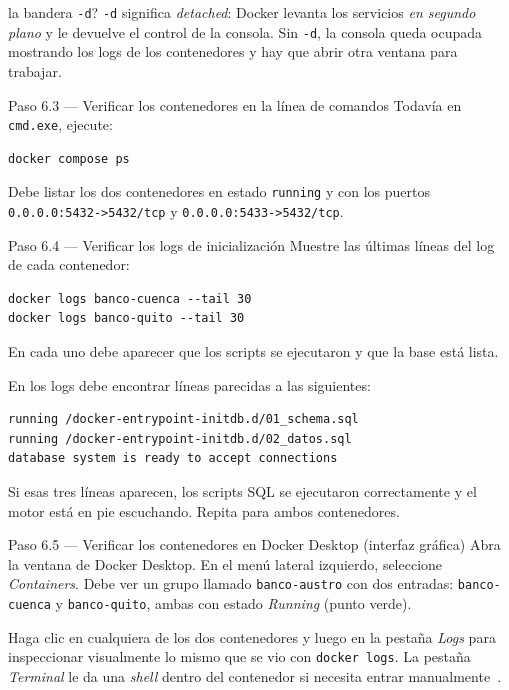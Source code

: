\documentclass[11pt,a4paper]{article}
\begin{document}
\begin{conceptobox}{la bandera \texttt{-d}?}
\texttt{-d} significa \emph{detached}: Docker levanta los servicios \emph{en segundo plano} y le devuelve el control de la consola. Sin \texttt{-d}, la consola queda ocupada mostrando los logs de los contenedores y hay que abrir otra ventana para trabajar.
\end{conceptobox}

\begin{pasobox}{Paso 6.3 --- Verificar los contenedores en la l\'inea de comandos}
Todav\'ia en \texttt{cmd.exe}, ejecute:

\begin{lstlisting}[style=bashstyle]
docker compose ps
\end{lstlisting}

Debe listar los dos contenedores en estado \texttt{running} y con los puertos \texttt{0.0.0.0:5432->5432/tcp} y \texttt{0.0.0.0:5433->5432/tcp}.
\end{pasobox}

\begin{pasobox}{Paso 6.4 --- Verificar los logs de inicializaci\'on}
Muestre las \'ultimas l\'ineas del log de cada contenedor:

\begin{lstlisting}[style=bashstyle]
docker logs banco-cuenca --tail 30
docker logs banco-quito --tail 30
\end{lstlisting}

En cada uno debe aparecer que los scripts se ejecutaron y que la base est\'a lista.
\end{pasobox}

\begin{verifbox}
En los logs debe encontrar l\'ineas parecidas a las siguientes:

\begin{lstlisting}[style=plainstyle]
running /docker-entrypoint-initdb.d/01_schema.sql
running /docker-entrypoint-initdb.d/02_datos.sql
database system is ready to accept connections
\end{lstlisting}

Si esas tres l\'ineas aparecen, los scripts SQL se ejecutaron correctamente y el motor est\'a en pie escuchando. Repita para ambos contenedores.
\end{verifbox}

\begin{pasobox}{Paso 6.5 --- Verificar los contenedores en Docker Desktop (interfaz gr\'afica)}
Abra la ventana de Docker Desktop. En el men\'u lateral izquierdo, seleccione \emph{Containers}. Debe ver un grupo llamado \texttt{banco-austro} con dos entradas: \texttt{banco-cuenca} y \texttt{banco-quito}, ambas con estado \emph{Running} (punto verde).

Haga clic en cualquiera de los dos contenedores y luego en la pesta\~na \emph{Logs} para inspeccionar visualmente lo mismo que se vio con \texttt{docker logs}. La pesta\~na \emph{Terminal} le da una \emph{shell} dentro del contenedor si necesita entrar manualmente~\cite{DockerCompose2024}.
\end{pasobox}
\end{document}
